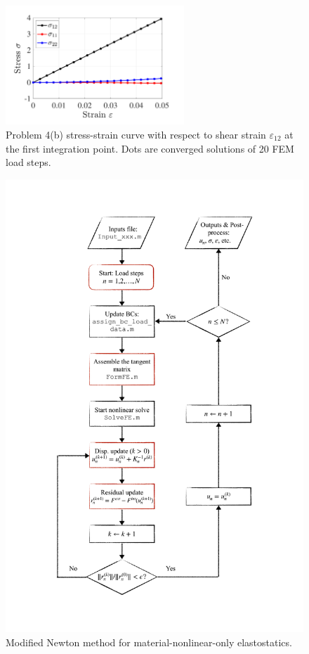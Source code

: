 \begin{figure}[!ht]
    \centering
    \includegraphics[width=0.6\textwidth]{midterm/midterm_p4_shear.pdf}
    \caption{Problem 4(b) stress-strain curve with respect to shear strain $\varepsilon_{12}$ at the first integration point. Dots are converged solutions of 20 FEM load steps.}
    \label{fig:midterm_p4_shear}
\end{figure}

\newpage
\begin{figure}[!ht]
    \centering
    \includegraphics[width=0.9\linewidth]{midterm/flow_chart.pdf}
    \caption{Modified Newton method for material-nonlinear-only elastostatics.}
    \label{fig:midterm_flow_chart}
\end{figure}

